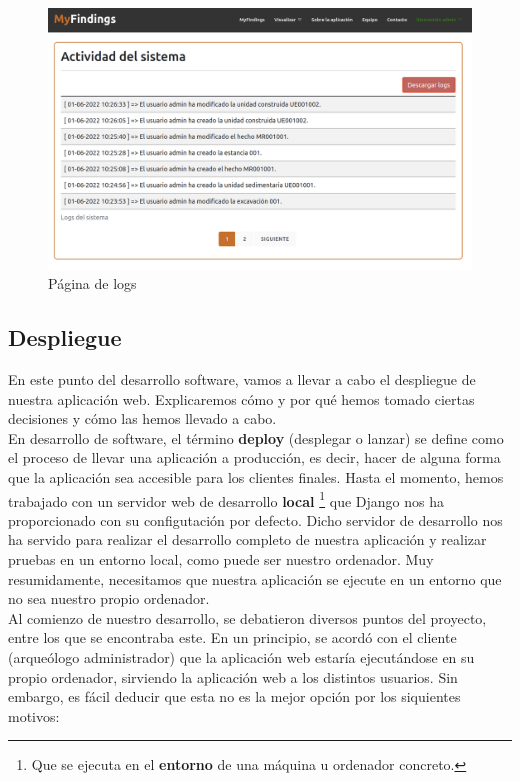 \begin{enumerate}
            \begin{figure}[H]
                \centering
                \includegraphics[scale=0.20]{imagenes/logs.png}
                \caption{Página de logs}
                \label{fig:log-template}
            \end{figure}

    \end{enumerate}

\subsection{Despliegue}
En este punto del desarrollo software, vamos a llevar a cabo el despliegue de
nuestra aplicación web. Explicaremos cómo y por qué hemos tomado ciertas decisiones
y cómo las hemos llevado a cabo. \\

En desarrollo de software, el término \textbf{deploy} (desplegar o lanzar) \cite{deploy} 
se define como el proceso de llevar una aplicación a producción, es decir, hacer de alguna
forma que la aplicación sea accesible para los clientes finales. Hasta el momento, hemos
trabajado con un servidor web de desarrollo \textbf{local} \footnote{Que se ejecuta en el
\textbf{entorno} de una máquina u ordenador concreto.} que Django nos ha proporcionado
con su configutación por defecto. Dicho servidor de desarrollo nos ha servido para
realizar el desarrollo completo de nuestra aplicación y realizar pruebas en un entorno
local, como puede ser nuestro ordenador. Muy resumidamente, necesitamos que nuestra
aplicación se ejecute en un entorno que no sea nuestro propio ordenador. \\

Al comienzo de nuestro desarrollo, se debatieron diversos puntos del proyecto, entre los
que se encontraba este. En un principio, se acordó con el cliente (arqueólogo administrador)
que la aplicación web estaría ejecutándose en su propio ordenador, sirviendo la aplicación
web a los distintos usuarios. Sin embargo, es fácil deducir que esta no es la mejor opción por
los siquientes motivos:

